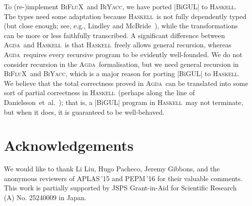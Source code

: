 \documentclass{sigplanconf}
\newcommand{\BiFluX}{\textsc{BiFluX}}
\newcommand{\Agda}{\textsc{Agda}}
\newcommand{\Haskell}{\textsc{Haskell}}
\newcommand{\BiYacc}{\textsc{BiYacc}}
\begin{document}
To (re-)implement \BiFluX\ and \BiYacc, we have ported |BiGUL| to \Haskell.
The types need some adaptation because \Haskell\ is not fully dependently typed (but close enough; see, e.g., Lindley and McBride~\cite{Lindley-Hasochism}), while the transformations can be more or less faithfully transcribed.
A significant difference between \Agda\ and \Haskell\ is that \Haskell\ freely allows general recursion, whereas \Agda\ requires every recursive program to be evidently well-founded.
We do not consider recursion in the \Agda\ formalisation, but we need general recursion in \BiFluX\ and \BiYacc, which is a major reason for porting |BiGUL| to \Haskell.
We believe that the total correctness proved in \Agda\ can be translated into some sort of partial correctness in \Haskell\ (perhaps along the line of Danielsson~et~al.~\cite{Danielsson-fast-and-loose-reasoning}); that is, a |BiGUL| program in \Haskell\ may not terminate, but when it does, it is guaranteed to be well-behaved.

\section*{Acknowledgements}

We would like to thank Li Liu, Hugo Pacheco, Jeremy Gibbons, and the anonymous reviewers of APLAS\,'15 and PEPM\,'16 for their valuable comments.
This work is partially supported by JSPS Grant-in-Aid for Scientific Research (A) No. 25240009 in Japan.

\end{document}
